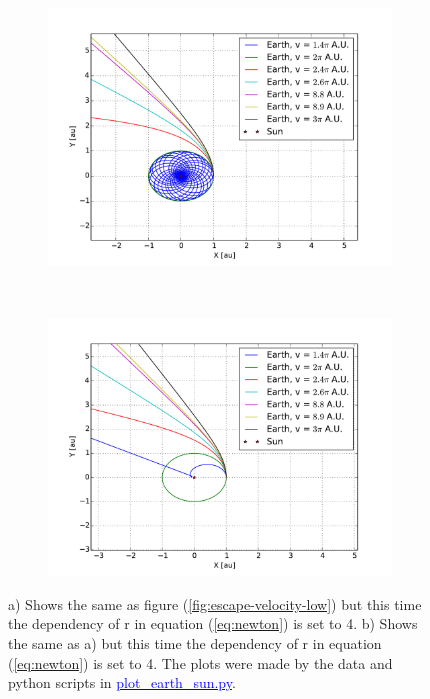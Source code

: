 \begin{figure}[H]
    \centering
    \begin{subfigure}{0.5\textwidth}
        \centering
        \includegraphics[width=\linewidth]{result/bilder/escape-velocity-r275.pdf}
    	\caption{}
    \end{subfigure}%
    ~ 
    \begin{subfigure}{0.5\textwidth}
        \centering
        \includegraphics[width=\linewidth]{result/bilder/escape-velocity-r3.pdf}
        \caption{}
    \end{subfigure}
    \caption{a) Shows the same as figure (\ref{fig:escape-velocity-low}) but this time the dependency of r in equation (\ref{eq:newton}) is set to 4. b) Shows the same as a) but this time the dependency of r in equation (\ref{eq:newton}) is set to 4. The plots were made by the data and python scripts in \href{https://github.com/erikfsk/Project-3/tree/master/Project3/escape-velocity}{\textcolor{blue}{plot\_earth\_sun.py}}.}
    \label{fig:escape-velocity-high}
\end{figure}


